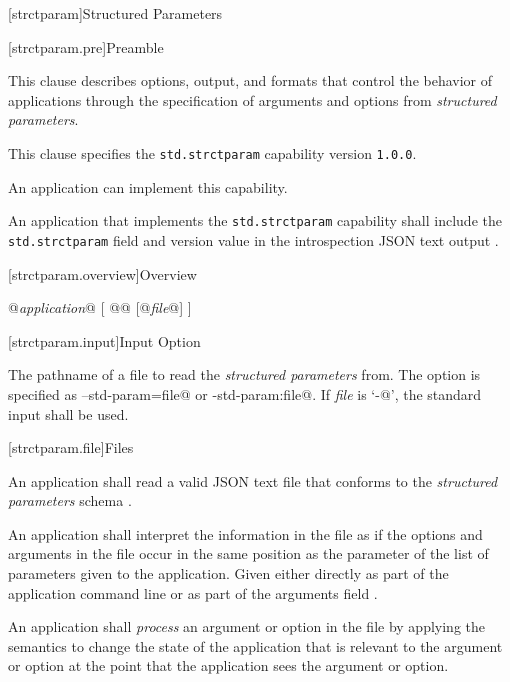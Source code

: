 
[strctparam]{Structured Parameters}


[strctparam.pre]{Preamble}

\pnum
This clause describes options, output, and formats that control the behavior of
applications through the specification of arguments and options from
\emph{structured parameters}.

\pnum
This clause specifies the \verb|std.strctparam| capability 
version \verb|1.0.0|.

\pnum
An application can implement this capability.

\pnum
An application that implements the \verb|std.strctparam| capability shall
include the \verb|std.strctparam| field and version value in the introspection
JSON text output .

[strctparam.overview]{Overview}

\pnum
\begin{outputblock}
@\emph{application}@ [ @@ [@\emph{file}@] ]
\end{outputblock}

[strctparam.input]{Input Option}

\pnum
{}
\begin{indented}
	The pathname of a file to read the \emph{structured parameters} from. The
	option is specified as \verb@--std-param=file@ or \verb@-std-param:file@. If
	\emph{file} is ‘\verb@-@’, the standard input shall be used.
\end{indented}

[strctparam.file]{Files}

\pnum
An application shall read a valid JSON text file that conforms to the
\emph{structured parameters} schema .

\pnum
An application shall interpret the information in the file as if the options
and arguments in the file occur in the same position as the
 parameter of the list of parameters given to
the application. Given either directly as part of the application command line
or as part of the arguments field .

\pnum
An application shall \emph{process} an argument or option in the file by
applying the semantics to change the state of the application that is relevant 
to the argument or option at the point that the application sees the argument 
or option.

